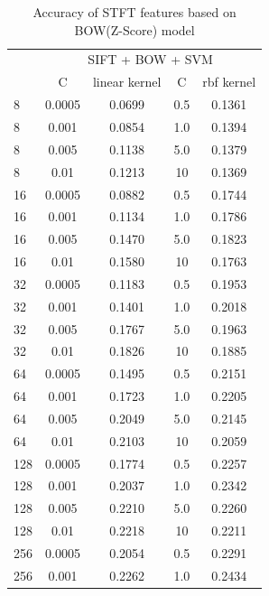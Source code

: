 \documentclass[conference]{IEEEtran}
\begin{document}
\begin{table}[htbp]
	\centering
	\newcommand{\tabincell}[2]{\begin{tabular}{@{}#1@{}}#2\end{tabular}}
	\renewcommand\arraystretch{1.0}
	\caption{Accuracy of STFT features based on BOW(Z-Score) model}
	\label{base1}%
	\begin{tabular}{@{}p{1cm}<{\centering}|c|c|c|c}
		\hline
		\multirow{2}{*}{\diagbox[height=2\line,width=1.42cm,font=\tiny]{$k$}{Acc.}{$\mathit{M}$}} &
		\multicolumn{4}{c}{SIFT + BOW + SVM}\\
		\cline{2-5}
		& {C} & {linear kernel} & {C} & {rbf kernel}\\
		\hline
		8   & 0.0005 & 0.0699 & 0.5 & 0.1361\\
		8   & 0.001 & 0.0854 & 1.0 & 0.1394\\
		8   & 0.005 & 0.1138 & 5.0 & 0.1379\\
        8   & 0.01  & 0.1213 & 10 & 0.1369\\
        \hline
		16   & 0.0005  & 0.0882 & 0.5 & 0.1744\\
		16   & 0.001  & 0.1134 & 1.0 & 0.1786\\
		16   & 0.005  & 0.1470 & 5.0 & 0.1823\\
        16   & 0.01  & 0.1580 & 10 & 0.1763\\
        \hline
		32   & 0.0005  & 0.1183 & 0.5 & 0.1953\\
		32   & 0.001  & 0.1401 & 1.0 & 0.2018\\
		32   & 0.005  & 0.1767 & 5.0 & 0.1963\\
        32   & 0.01  & 0.1826 & 10 & 0.1885\\
        \hline
		64   & 0.0005  & 0.1495 & 0.5 & 0.2151\\
		64   & 0.001  & 0.1723 & 1.0 & 0.2205\\
		64   & 0.005  & 0.2049 & 5.0 & 0.2145\\
        64   & 0.01  & 0.2103 & 10 & 0.2059\\
        \hline
		128   & 0.0005  & 0.1774 & 0.5 & 0.2257\\
		128   & 0.001  & 0.2037 & 1.0 & 0.2342\\
		128   & 0.005  & 0.2210 & 5.0 & 0.2260\\
        128   & 0.01  & 0.2218 & 10 & 0.2211\\
        \hline
		256   & 0.0005  & 0.2054 & 0.5 & 0.2291\\
		256   & 0.001  & 0.2262 & 1.0 & 0.2434\\

\end{tabular}
\end{table}
\end{document}
